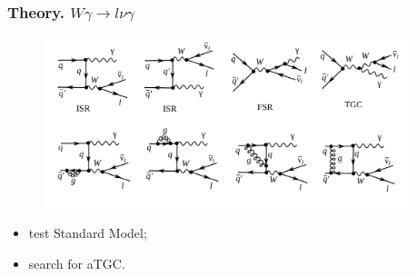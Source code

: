 \begin{frame}\frametitle{Theory. $W\gamma\rightarrow l\nu\gamma$}

   \begin{figure}[htb]
      \begin{center}
        \scriptsize
          \includegraphics[width=0.95\textwidth]{../figs/WgAbout/feynmWg_LO_NLO.png}
       \end{center}
    \end{figure}

  \begin{itemize}
    \scriptsize
    \item test Standard Model;
    \item search for aTGC.
  \end{itemize}
\end{frame}%
